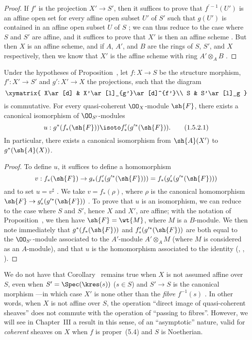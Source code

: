 \begin{proof}
\label{proof-2.1.5.1}
If $f'$ is the projection $X'\to S'$, then it suffices to prove that $f^{\prime-1}(U')$ is an affine open set for every affine open subset $U'$ of $S'$ such that $g(U')$ is contained in an affine open subset $U$ of $S$ ; we can thus reduce to the case where $S$ and $S'$ are affine, and it suffices to prove that $X'$ is then an affine scheme .
But then  $X$ is an affine scheme, and if $A$, $A'$, and $B$ are the rings of $S$, $S'$, and $X$ respectively, then we know that $X'$ is the affine scheme with ring $A'\otimes_A B$ .
\end{proof}

\begin{cor}[1.5.2]
\label{2.1.5.2}
Under the hypotheses of Proposition~, let $f:X\to S$ be the structure morphism, $f':X'\to S'$ and $g':X'\to X$ the projections, such that the diagram
\[
  \xymatrix{
    X\ar[d] &
    X'\ar[l]_{g'}\ar[d]^{f'}\\
    S &
    S'\ar[l]_g
  }
\]
is commutative.
For every quasi-coherent $\OO_X$-module $\sh{F}$, there exists a canonical isomorphism of $\OO_{S'}$-modules
\[
\label{2.1.5.2.1}
  u:g^*(f_*(\sh{F}))\isoto f_*'(g^{\prime*}(\sh{F})).
  \tag{1.5.2.1}
\]
In particular, there exists a canonical isomorphism from $\sh{A}(X')$ to $g^*(\sh{A}(X))$.
\end{cor}

\begin{proof}
\label{proof-2.1.5.2}
To define $u$, it suffices to define a homomorphism
\[
  v:f_*(\sh{F})\to g_*(f_*'(g^{\prime*}(\sh{F})))=f_*(g_*'(g^{\prime*}(\sh{F})))
\]
and to set $u=v^\sharp$ .
We take $v=f_*(\rho)$, where $\rho$ is the canonical homomorphism $\sh{F}\to g_*'(g^{\prime*}(\sh{F}))$ .
To prove that $u$ is an isomorphism, we can reduce to the case where $S$ and $S'$, hence $X$ and $X'$, are affine; with the notation of Proposition~, we then have $\sh{F}=\wt{M}$, where $M$ is a $B$-module.
We then note immediately that $g^*(f_*(\sh{F}))$ and $f_*'(g^{\prime*}(\sh{F}))$ are both equal to the $\OO_{S'}$-module associated to the $A'$-module $A'\otimes_A M$ (where $M$ is considered as an $A$-module), and that $u$ is the homomorphism associated to the identity (, , ).
\end{proof}

\begin{rmk}[1.5.3]
\label{2.1.5.3}
We do not have that Corollary~ remains true when $X$ is not assumed affine over $S$, even when $S'=\Spec(\kres(s))$ ($s\in S$) and $S'\to S$ is the canonical morphism ---in which case $X'$ is none other than the \emph{fibre $f^{-1}(s)$} .
In other words, when $X$ is not affine over $S$, the operation
``direct image of quasi-coherent sheaves'' does not commute with the operation of ``passing to fibres''.
However, we will see in Chapter~III  a result in this sense, of an ``asymptotic'' nature, valid for \emph{coherent} sheaves on $X$ when $f$ is proper~(5.4) and $S$ is Noetherian.
\end{rmk}

